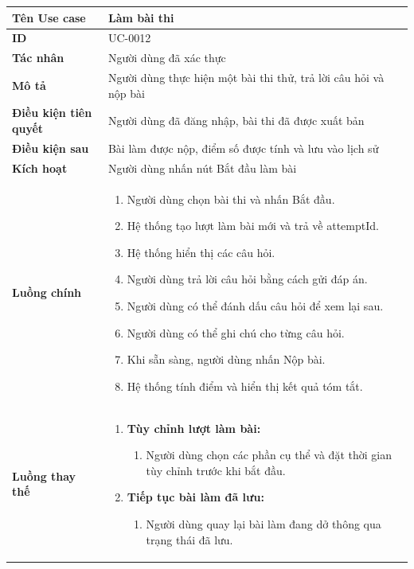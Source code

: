 {
\small
\renewcommand{\arraystretch}{1.15}

\begin{tabularx}{\textwidth}{|>{\raggedright\arraybackslash}p{3.5cm}|>{\raggedright\arraybackslash}X|}
\hline
\textbf{Tên Use case} & Làm bài thi \\
\hline
\textbf{ID} & UC-0012 \\
\hline
\textbf{Tác nhân} & Người dùng đã xác thực \\
\hline
\textbf{Mô tả} & Người dùng thực hiện một bài thi thử, trả lời câu hỏi và nộp bài \\
\hline
\textbf{Điều kiện tiên quyết} & Người dùng đã đăng nhập, bài thi đã được xuất bản \\
\hline
\textbf{Điều kiện sau} & Bài làm được nộp, điểm số được tính và lưu vào lịch sử \\
\hline
\textbf{Kích hoạt} & Người dùng nhấn nút Bắt đầu làm bài \\
\hline
\textbf{Luồng chính} &
\begin{enumerate}
    \item Người dùng chọn bài thi và nhấn Bắt đầu.
    \item Hệ thống tạo lượt làm bài mới và trả về attemptId.
    \item Hệ thống hiển thị các câu hỏi.
    \item Người dùng trả lời câu hỏi bằng cách gửi đáp án.
    \item Người dùng có thể đánh dấu câu hỏi để xem lại sau.
    \item Người dùng có thể ghi chú cho từng câu hỏi.
    \item Khi sẵn sàng, người dùng nhấn Nộp bài.
    \item Hệ thống tính điểm và hiển thị kết quả tóm tắt.
\end{enumerate} \\
\hline
\textbf{Luồng thay thế} &
\begin{enumerate}
    \item \textbf{Tùy chỉnh lượt làm bài:}
    \begin{enumerate}
        \item[1A.] Người dùng chọn các phần cụ thể và đặt thời gian tùy chỉnh trước khi bắt đầu.
    \end{enumerate}
    \item \textbf{Tiếp tục bài làm đã lưu:}
    \begin{enumerate}
        \item[1B.] Người dùng quay lại bài làm đang dở thông qua trạng thái đã lưu.

\end{enumerate}
\end{enumerate}
\end{tabularx}}
